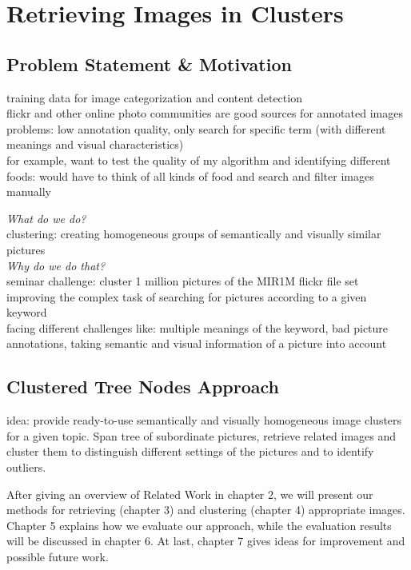 \section{Retrieving Images in Clusters}
\label{sec_introduction}


\subsection{Problem Statement \& Motivation}
training data for image categorization and content detection \\
flickr and other online photo communities are good sources for annotated images \\
problems: low annotation quality, only search for specific term (with different meanings and visual characteristics) \\
for example, want to test the quality of my algorithm and identifying different foods: would have to think of all kinds of food and search and filter images manually

\bigskip

\emph{What do we do?} \\
clustering: creating homogeneous groups of semantically and visually similar pictures \\

\emph{Why do we do that?} \\
seminar challenge: cluster 1 million pictures of the MIR1M flickr file set \\
improving the complex task of searching for pictures according to a given keyword \\
facing different challenges like: multiple meanings of the keyword, bad picture annotations, taking semantic and visual information of a picture into account \\

\subsection{Clustered Tree Nodes Approach}
idea: provide ready-to-use semantically and visually homogeneous image clusters for a given topic. Span tree of subordinate pictures, retrieve related images and cluster them to distinguish different settings of the pictures and to identify outliers.

\bigskip

After giving an overview of Related Work in chapter 2, we will present our methods for retrieving (chapter 3) and clustering (chapter 4) appropriate images. Chapter 5 explains how we evaluate our approach, while the evaluation results will be discussed in chapter 6. At last, chapter 7 gives ideas for improvement and possible future work.
